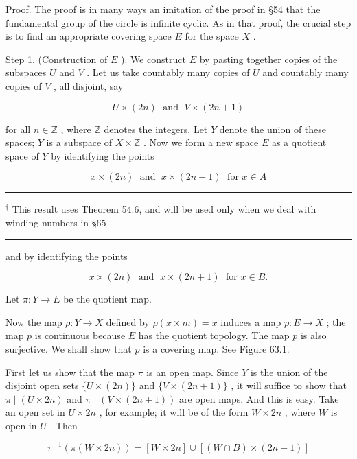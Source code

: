 \documentclass[10pt]{article}
\newcommand{\HRule}{\begin{center}\rule{0.9\linewidth}{0.2mm}\end{center}}
\begin{document}
Proof. The proof is in many ways an imitation of the proof in §54 that the fundamental group of the circle is infinite cyclic. As in that proof, the crucial step is to find an appropriate covering space \(E\) for the space \(X\) .

Step 1. (Construction of \(E\) ). We construct \(E\) by pasting together copies of the subspaces \(U\) and \(V\) . Let us take countably many copies of \(U\) and countably many copies of \(V\) , all disjoint, say

\[
U \times  \left( {2n}\right) \;\text{ and }\;V \times  \left( {{2n} + 1}\right)
\]

for all \(n \in  \mathbb{Z}\) , where \(\mathbb{Z}\) denotes the integers. Let \(Y\) denote the union of these spaces; \(Y\) is a subspace of \(X \times  \mathbb{Z}\) . Now we form a new space \(E\) as a quotient space of \(Y\) by identifying the points

\[
x \times  \left( {2n}\right) \;\text{ and }\;x \times  \left( {{2n} - 1}\right) \;\text{ for }x \in  A
\]

\HRule

\({}^{ \dagger  }\) This result uses Theorem 54.6, and will be used only when we deal with winding numbers in §65

\HRule

and by identifying the points

\[
x \times  \left( {2n}\right) \;\text{ and }\;x \times  \left( {{2n} + 1}\right) \;\text{ for }x \in  B.
\]

Let \(\pi  : Y \rightarrow  E\) be the quotient map.

Now the map \(\rho  : Y \rightarrow  X\) defined by \(\rho \left( {x \times  m}\right)  = x\) induces a map \(p : E \rightarrow  X\) ; the map \(p\) is continuous because \(E\) has the quotient topology. The map \(p\) is also surjective. We shall show that \(p\) is a covering map. See Figure 63.1.

First let us show that the map \(\pi\) is an open map. Since \(Y\) is the union of the disjoint open sets \(\{ U \times  \left( {2n}\right) \}\) and \(\{ V \times  \left( {{2n} + 1}\right) \}\) , it will suffice to show that \(\pi  \mid  \left( {U \times  {2n}}\right)\) and \(\pi  \mid  \left( {V \times  \left( {{2n} + 1}\right) }\right)\) are open maps. And this is easy. Take an open set in \(U \times  {2n}\) , for example; it will be of the form \(W \times  {2n}\) , where \(W\) is open in \(U\) . Then

\[
{\pi }^{-1}\left( {\pi \left( {W \times  {2n}}\right) }\right)  = \left\lbrack  {W \times  {2n}}\right\rbrack   \cup  \left\lbrack  {\left( {W \cap  B}\right)  \times  \left( {{2n} + 1}\right) }\right\rbrack
\]
\end{document}
